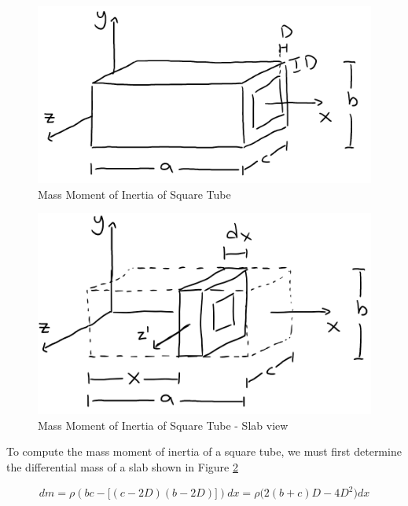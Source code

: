 \begin{figure}
    \centering
    \includegraphics{4_ComponentProperties/img/inertia_square_tube.png}
    \caption{Mass Moment of Inertia of Square Tube}
    \label{fig:inertia_square_tube}
\end{figure}


\begin{figure}[H]
    \centering
    \includegraphics{7_Appendices/img/inertia_square_tube_slab.png}
    \caption{Mass Moment of Inertia of Square Tube - Slab view}
    \label{fig:inertia_slab}
\end{figure}

To compute the mass moment of inertia of a square tube, we must first determine the differential mass of a slab shown in Figure \ref{fig:inertia_slab}

\begin{equation}
    dm = \rho(bc - \big[(c-2D)(b-2D)\big])dx = \rho\big(2(b+c)D-4D^2\big)dx
\end{equation}

